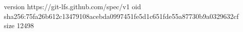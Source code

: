 version https://git-lfs.github.com/spec/v1
oid sha256:75fa26b612c13479108acebda0997451fe5d1c651fde55a87730b9a0329632cf
size 12498
